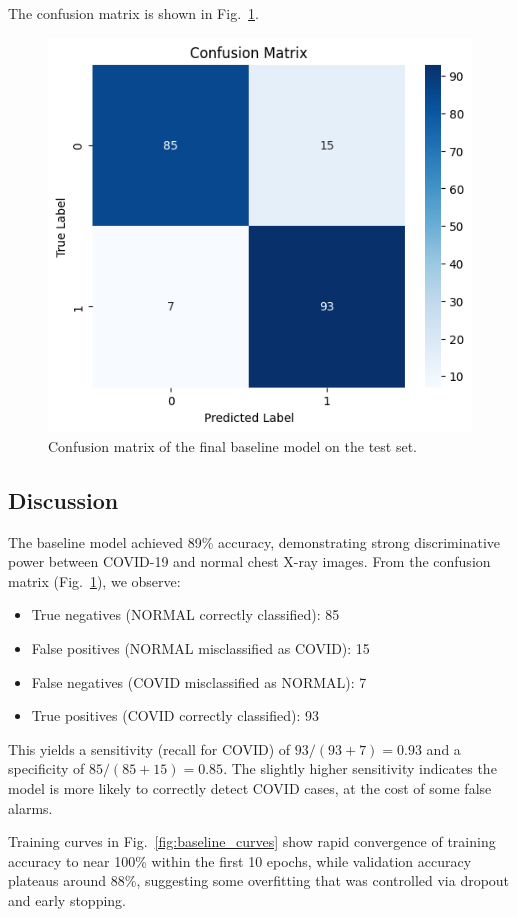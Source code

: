 \documentclass[conference]{IEEEtran}
\begin{document}
The confusion matrix is shown in Fig.~\ref{fig:conf_matrix}.

\begin{figure}[htbp]
	\centerline{\includegraphics[width=0.7\linewidth]{Images/confusion_matrix_baseline.png}}
	\caption{Confusion matrix of the final baseline model on the test set.}
	\label{fig:conf_matrix}
\end{figure}

\subsection{Discussion}
The baseline model achieved 89\% accuracy, demonstrating strong discriminative power between COVID-19 and normal chest X-ray images. From the confusion matrix (Fig.~\ref{fig:conf_matrix}), we observe:

\begin{itemize}
	\item True negatives (NORMAL correctly classified): 85
	\item False positives (NORMAL misclassified as COVID): 15
	\item False negatives (COVID misclassified as NORMAL): 7
	\item True positives (COVID correctly classified): 93
\end{itemize}

This yields a sensitivity (recall for COVID) of $93/(93+7)=0.93$ and a specificity of $85/(85+15)=0.85$. The slightly higher sensitivity indicates the model is more likely to correctly detect COVID cases, at the cost of some false alarms.  

Training curves in Fig.~\ref{fig:baseline_curves} show rapid convergence of training accuracy to near 100\% within the first 10 epochs, while validation accuracy plateaus around 88\%, suggesting some overfitting that was controlled via dropout and early stopping.  
\end{document}
